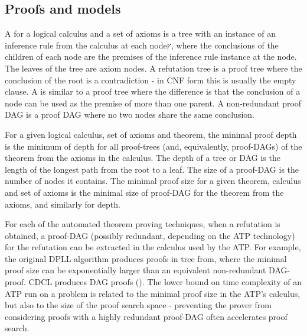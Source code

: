 \subsection*{Proofs and models}
A  for a logical calculus and a set of axioms is a tree with an instance of an inference rule from the calculus at each nodeץ, where the conclusions of the children of each node are the premises of the inference rule instance at the node. The leaves of the tree are axiom nodes.
A refutation tree is a proof tree where the conclusion of the root is a contradiction - in CNF form this is usually the empty clause.
A  is similar to a proof tree where the difference is that the conclusion of a node can be used as the premise of more than one parent. A non-redundant proof DAG is a proof DAG where no two nodes share the same conclusion.

For a given logical calculus, set of axioms and theorem, the minimal proof depth is the minimum of depth for all proof-trees (and, equivalently, proof-DAGs) of the theorem from the axioms in the calculus. The depth of a tree or DAG is the length of the longest path from the root to a leaf. The size of a proof-DAG is the number of nodes it contains. 
The minimal proof size for a given theorem, calculus and set of axioms is the minimal size of proof-DAG for the theorem from the axioms, and similarly for depth.

For each of the automated theorem proving techniques, when a refutation is obtained, a proof-DAG (possibly redundant, depending on the ATP technology) for the refutation can be extracted in the calculus used by the ATP. For example, the original DPLL algorithm produces proofs in tree from, where the minimal proof size can be exponentially larger than an equivalent non-redundant DAG-proof. CDCL produces DAG proofs (\cite{DBLP:conf/aaai/HertelBPG08}). The lower bound on time complexity of an ATP run on a problem is related to the minimal proof size in the ATP's calculus, but also to the size of the proof search space - preventing the prover from considering proofs with a highly redundant proof-DAG often accelerates proof search.

